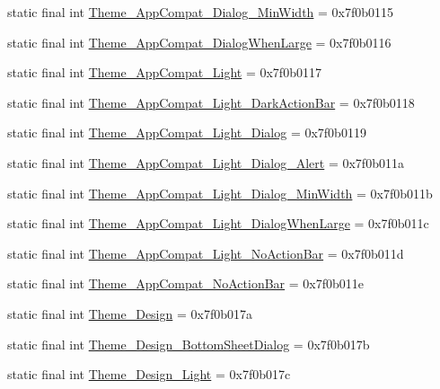 \begin{CompactItemize}
\item 
static final int \hyperlink{classandroid_1_1support_1_1v4_1_1_r_1_1style_322c4b92f39b3744a78f251214768ac9}{Theme\_\-AppCompat\_\-Dialog\_\-MinWidth} = 0x7f0b0115
\item 
static final int \hyperlink{classandroid_1_1support_1_1v4_1_1_r_1_1style_11326119203960d6bdc738e6029d7809}{Theme\_\-AppCompat\_\-DialogWhenLarge} = 0x7f0b0116
\item 
static final int \hyperlink{classandroid_1_1support_1_1v4_1_1_r_1_1style_2bb5264ebd039c69715e6e24e4f4dd4c}{Theme\_\-AppCompat\_\-Light} = 0x7f0b0117
\item 
static final int \hyperlink{classandroid_1_1support_1_1v4_1_1_r_1_1style_235af6f609c6e9b27b1a7dfeff70da4e}{Theme\_\-AppCompat\_\-Light\_\-DarkActionBar} = 0x7f0b0118
\item 
static final int \hyperlink{classandroid_1_1support_1_1v4_1_1_r_1_1style_8abc3aca27dc77b378350c351eb4268f}{Theme\_\-AppCompat\_\-Light\_\-Dialog} = 0x7f0b0119
\item 
static final int \hyperlink{classandroid_1_1support_1_1v4_1_1_r_1_1style_7491e5d7cfe1785e553aa1cf5d59861d}{Theme\_\-AppCompat\_\-Light\_\-Dialog\_\-Alert} = 0x7f0b011a
\item 
static final int \hyperlink{classandroid_1_1support_1_1v4_1_1_r_1_1style_4e518d0d0e7173a864dc4175e0b9ed3f}{Theme\_\-AppCompat\_\-Light\_\-Dialog\_\-MinWidth} = 0x7f0b011b
\item 
static final int \hyperlink{classandroid_1_1support_1_1v4_1_1_r_1_1style_b0808169b3ba9395c65019e8df9dfe55}{Theme\_\-AppCompat\_\-Light\_\-DialogWhenLarge} = 0x7f0b011c
\item 
static final int \hyperlink{classandroid_1_1support_1_1v4_1_1_r_1_1style_445f78330bfee903af7e0583c99217ce}{Theme\_\-AppCompat\_\-Light\_\-NoActionBar} = 0x7f0b011d
\item 
static final int \hyperlink{classandroid_1_1support_1_1v4_1_1_r_1_1style_edb7f5bb3e489efea13ecbe76e138637}{Theme\_\-AppCompat\_\-NoActionBar} = 0x7f0b011e
\item 
static final int \hyperlink{classandroid_1_1support_1_1v4_1_1_r_1_1style_0fde6623e5776df63c985a1486992d5e}{Theme\_\-Design} = 0x7f0b017a
\item 
static final int \hyperlink{classandroid_1_1support_1_1v4_1_1_r_1_1style_1b709b0a1fe1dc1dbb6a8931160a9ca0}{Theme\_\-Design\_\-BottomSheetDialog} = 0x7f0b017b
\item 
static final int \hyperlink{classandroid_1_1support_1_1v4_1_1_r_1_1style_e76ceb074a27ec1637727a865275106e}{Theme\_\-Design\_\-Light} = 0x7f0b017c

\end{CompactItemize}
